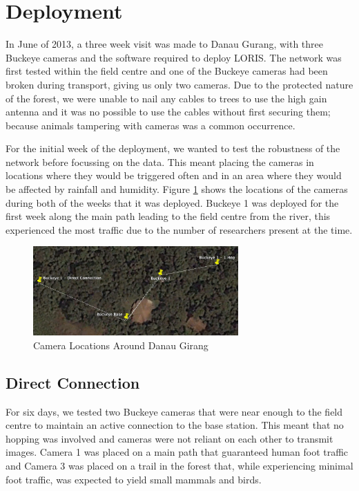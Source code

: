 	\section{Deployment}\label{loris:dep}
		In June of 2013, a three week visit was made to Danau Gurang, with three Buckeye cameras and the software required to deploy LORIS. The network was first tested within the field centre and one of the Buckeye cameras had been broken during transport, giving us only two cameras. Due to the protected nature of the forest, we were unable to nail any cables to trees to use the high gain antenna and it was no possible to use the cables without first securing them; because animals tampering with cameras was a common occurrence.
		
		For the initial week of the deployment, we wanted to test the robustness of the network before focussing on the data. This meant placing the cameras in locations where they would be triggered often and in an area where they would be affected by rainfall and humidity. Figure \ref{cam_locs} shows the locations of the cameras during both of the weeks that it was deployed. Buckeye 1 was deployed for the first week along the main path leading to the field centre from the river, this experienced the most traffic due to the number of researchers present at the time. 
	
	    \begin{figure}[!t]
	    \centering
		\includegraphics[width=0.70\textwidth]{Chap6/figures/buckeye}
	    \caption{Camera Locations Around Danau Girang}
	    \label{cam_locs}
	    \end{figure}
	
	\subsection{Direct Connection}
	For six days, we tested two Buckeye cameras that were near enough to the field centre to maintain an active connection to the base station. This meant that no hopping was involved and cameras were not reliant on each other to transmit images. Camera 1 was placed on a main path that guaranteed human foot traffic and Camera 3 was placed on a trail in the forest that, while experiencing minimal foot traffic, was expected to yield small mammals and birds.
	
